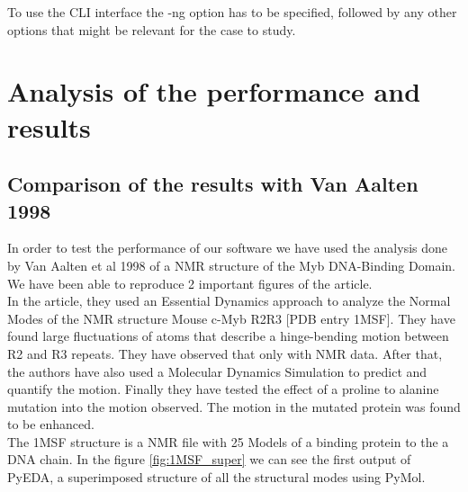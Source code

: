 \documentclass[12pt]{article}
\begin{document}
 To use the CLI interface the -ng option has to be specified, followed by any other options that might be relevant for the case to study.\\
 
\section{Analysis of the performance and results}
\subsection{Comparison of the results with Van Aalten 1998}
In order to test the performance of our software we have used the analysis done by Van Aalten et al 1998 \citep{VanAalten1998} of a NMR structure of the Myb DNA-Binding Domain. We have been able to reproduce 2 important figures of the article.\\
 
In the article, they used an Essential Dynamics approach to analyze the Normal Modes of the NMR structure Mouse c-Myb R2R3 [PDB entry 1MSF\citep{Ogata1994}]. They have found large fluctuations of atoms that describe a hinge-bending motion between R2 and R3 repeats. They have observed that only with NMR data. After that, the authors have also used a Molecular Dynamics Simulation to predict and quantify the motion. Finally they have tested the effect of a proline to alanine mutation into the motion observed. The motion in the mutated protein was found to be enhanced.\\ 

The 1MSF structure is a NMR file with 25 Models of a binding protein to the a DNA chain. In the figure \ref{fig:1MSF_super} we can see the first output of PyEDA, a superimposed structure of all the structural modes using PyMol\citep{PyMOL}. 
\end{document}
